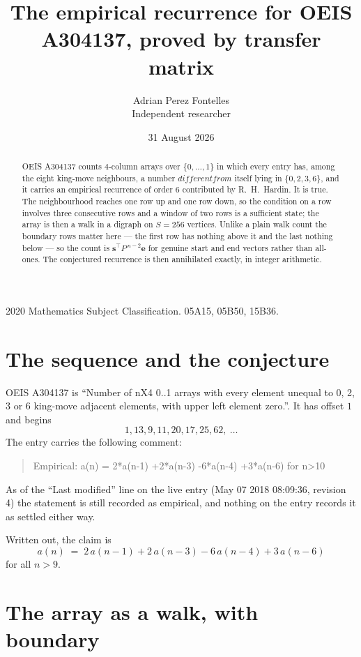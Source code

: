 \documentclass[11pt,a4paper]{article}
\title{The empirical recurrence for OEIS A304137, proved by transfer matrix}
\author{Adrian Perez Fontelles\\ \small Independent researcher}
\date{31 August 2026}
\theoremstyle{plain}
\theoremstyle{definition}
\begin{document}
\maketitle

\begin{abstract}
OEIS A304137 counts $4$-column arrays over $\{0,\dots,1\}$ in which every entry has,
among the eight king-move neighbours, a number $different from$ itself lying in $\{0,2,3,6\}$, and it carries an empirical
recurrence of order $6$ contributed by R.~H.~Hardin. It is true. The neighbourhood
reaches one row up and one row down, so the condition on a row involves three consecutive
rows and a window of two rows is a sufficient state; the array is then a walk in a digraph
on $S=256$ vertices. Unlike a plain walk count the boundary rows matter here --- the first
row has nothing above it and the last nothing below --- so the count is
$\mathbf{s}^{\!\top}P^{\,n-2}\mathbf{e}$ for genuine start and end vectors rather than
all-ones. The conjectured recurrence is then annihilated exactly, in integer arithmetic.
\end{abstract}

\noindent\small 2020 Mathematics Subject Classification. 05A15, 05B50, 15B36.\normalsize

\section{The sequence and the conjecture}

OEIS A304137 is ``Number of nX4 0..1 arrays with every element unequal to 0, 2, 3 or 6 king-move adjacent elements, with upper left element zero.''. It has offset
$1$ and begins
\[
1, 13, 9, 11, 20, 17, 25, 62,\ \dots
\]
The entry carries the following comment:
\begin{quote}\small
Empirical: a(n) = 2*a(n-1) +2*a(n-3) -6*a(n-4) +3*a(n-6) for n>10
\end{quote}
As of the ``Last modified'' line on the live entry (May 07 2018 08:09:36, revision
4) the statement is still recorded as empirical, and nothing on the entry
records it as settled either way.

Written out, the claim is
\begin{equation}\label{eq:conj}
a(n)\;=\;2\,a(n-1) + 2\,a(n-3) - 6\,a(n-4) + 3\,a(n-6)
\end{equation}
for all $n>9$.

\section{The array as a walk, with boundary}
\end{document}
